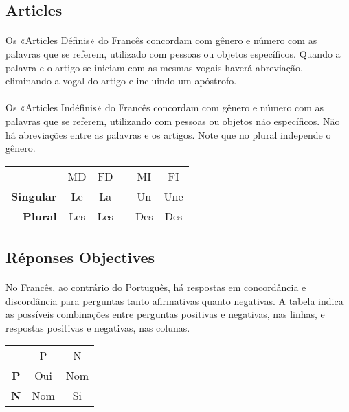\documentclass{article}
\begin{document}
    \subsection{Articles}
        \paragraph{}Os «Articles Définis» do Francês concordam com gênero e número com as palavras que se referem, utilizado com pessoas ou objetos específicos. Quando a palavra e o artigo se iniciam com as mesmas vogais haverá abreviação, eliminando a vogal do artigo e incluindo um apóstrofo.
        
        \paragraph{}Os «Articles Indéfinis» do Francês concordam com gênero e número com as palavras que se referem, utilizando com pessoas ou objetos não específicos. Não há abreviações entre as palavras e os artigos. Note que no plural independe o gênero. 

            \begin{center}
                \begin{tabular}{r c c c c c}
                                      & MD  & FD  & & MI  & FI\\[1ex]
                    \textbf{Singular} & Le  & La  & & Un  & Une\\
                    \textbf{Plural}   & Les & Les & & Des & Des\\
                \end{tabular}
            \end{center}           

    \subsection{Réponses Objectives}
        \paragraph{}No Francês, ao contrário do Português, há respostas em concordância e discordância para perguntas tanto afirmativas quanto negativas. A tabela indica as possíveis combinações entre perguntas positivas e negativas, nas linhas, e respostas positivas e negativas, nas colunas.
            
            \begin{center}
                \begin{tabular}{c c c}
                               & P   & N\\
                    \textbf{P} & Oui & Nom\\
                    \textbf{N} & Nom & Si\\
                \end{tabular}
            \end{center}    
            
\end{document}
